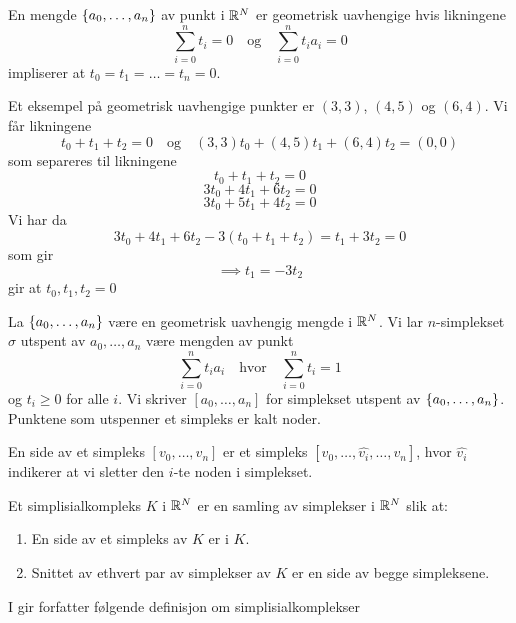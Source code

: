 \begin{definisjon}\label{def:GeoUav}
  En mengde $\left\{a_0,\dots,a_n\right\}$ av punkt i $\mathbb{R}^N$ er
  geometrisk uavhengige hvis likningene
  \[\sum_{i=0}^nt_i
  = 0\quad\text{og}\quad\sum_{i=0}^nt_ia_i=0\]
  impliserer at $t_0=t_1=\dots=t_n=0$.
\end{definisjon}

\begin{eksempel}
  Et eksempel på geometrisk uavhengige punkter er $(3,3)$,
  $(4,5)$ og $(6,4)$. Vi får likningene
  \[t_0 + t_1 +t_2 = 0\quad\text{og}\quad
  (3,3)t_0+(4,5)t_1+(6,4)t_2 = (0,0)\]
  som separeres til likningene
  \[t_0+t_1+t_2 = 0\]
  \[3t_0+4t_1+6t_2 = 0\]
  \[3t_0+5t_1+4t_2 = 0\]
  Vi har da
  \[3t_0+4t_1+6t_2 - 3(t_0+t_1+t_2) = t_1+3t_2 = 0\]
  som gir
  \[\implies t_1 = -3t_2\]
  gir at $t_0,t_1,t_2 = 0$
\end{eksempel}

\begin{definisjon}\label{def:n-simp} 
  La $\left\{a_0,\dots,a_n\right\}$ være en geometrisk uavhengig mengde
  i $\mathbb{R}^N$. Vi lar $n$-simplekset $\sigma$ utspent av
  $a_0,\dots,a_n$ være mengden av punkt
  \[\sum_{i=0}^nt_ia_i\quad\text{hvor}\quad\sum_{i=0}^nt_i = 1\]
  og $t_i\geq0$ for alle $i$. Vi skriver $[a_0,\dots,a_n]$ for
  simplekset utspent av $\left\{a_0,\dots,a_n\right\}$. Punktene som utspenner et simpleks er kalt noder.
\end{definisjon}

\begin{definisjon}
  En side av et simpleks $[v_0,\dots,v_n]$ er et simpleks $[v_0,\dots,\hat{v_i},\dots,v_n]$, hvor $\hat{v_i}$ indikerer at vi sletter den $i$-te noden i simplekset. 
\end{definisjon}

\begin{definisjon}\label{def:SimpKomp}
  Et simplisialkompleks $K$ i $\mathbb{R}^N$ er en samling av simplekser
  i $\mathbb{R}^N$ slik at:
  \begin{enumerate}
    \item En side av et simpleks av $K$ er i $K$.\\
    \item Snittet av ethvert par av simplekser av $K$ er en side
      av begge simpleksene.
  \end{enumerate}
\end{definisjon}

I \citep[seksjon 5]{MunkresJamesR.2018EOAT} gir forfatter følgende
definisjon om simplisialkomplekser

